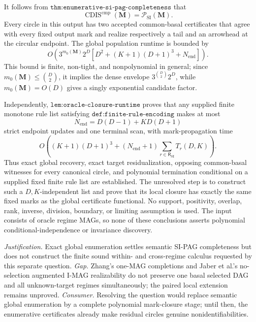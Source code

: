 \documentclass{article}
\begin{document}
It follows from \(\texttt{thm:enumerative-si-pag-completeness}\) that
\[
\operatorname{CDIS}^{\mathrm{cmp}}(\mathbf M)
=\mathcal P_{\mathrm{SI}}(\mathbf M).
\]
Every circle in this output has two accepted common-basal certificates that agree with every fixed output mark and realize respectively a tail and an arrowhead at the circular endpoint.  The global population runtime is bounded by
\[
O\!\left(
3^{m_0(\mathbf M)}2^D
\left[D^2+(K+1)(D+1)^3+N_{\mathrm{end}}\right]
\right).
\]
This bound is finite, non-tight, and nonpolynomial in general; since \(m_0(\mathbf M)\le\binom D2\), it implies the dense envelope \(3^{\binom D2}2^D\), while \(m_0(\mathbf M)=O(D)\) gives a singly exponential candidate factor.

Independently, \(\texttt{lem:oracle-closure-runtime}\) proves that any supplied finite monotone rule list satisfying \(\texttt{def:finite-rule-encoding}\) makes at most
\[
N_{\mathrm{end}}=D(D-1)+KD(D+1)
\]
strict endpoint updates and one terminal scan, with mark-propagation time
\[
O\!\left(
(K+1)(D+1)^3+
(N_{\mathrm{end}}+1)
\sum_{r\in\mathsf R_{\mathrm{SI}}}T_r(D,K)
\right).
\]
Thus exact global recovery, exact target residualization, opposing common-basal witnesses for every canonical circle, and polynomial termination conditional on a supplied fixed finite rule list are established.  The unresolved step is to construct such a \(D,K\)-independent list and prove that its local closure has exactly the same fixed marks as the global certificate functional.  No support, positivity, overlap, rank, inverse, division, boundary, or limiting assumption is used.  The input consists of oracle regime MAGs, so none of these conclusions asserts polynomial conditional-independence or invariance discovery.
\par\smallskip\noindent \textit{Justification.} Exact global enumeration settles semantic SI-PAG completeness but does not construct the finite sound within- and cross-regime calculus requested by this separate question. \textit{Gap.} Zhang's one-MAG completions and Jaber et al.'s no-selection augmented I-MAG realizability do not preserve one basal selected DAG and all unknown-target regimes simultaneously; the paired local extension remains unproved. \textit{Consumer.} Resolving the question would replace semantic global enumeration by a complete polynomial mark-closure stage; until then, the enumerative certificates already make residual circles genuine nonidentifiabilities.
\end{document}
